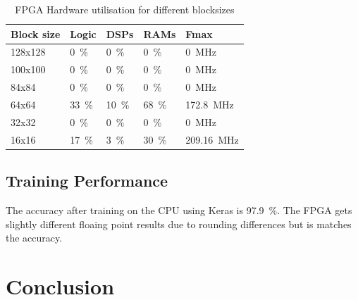 \documentclass[techrep,english]{ipsj} %
\begin{document}
\begin{table}[h]
  \centering
  \caption{FPGA Hardware utilisation for different blocksizes}\label{tab:fpga-util}
  \begin{tabular}{lllll}
    \toprule
    \textbf{Block size} & \textbf{Logic} & \textbf{DSPs} & \textbf{RAMs} & \textbf{Fmax} \\
    \midrule
    128x128 & \SI{0}{\percent} & \SI{0}{\percent} & \SI{0}{\percent} & \SI{0}{\mega\hertz}  \\
    100x100 & \SI{0}{\percent} & \SI{0}{\percent} & \SI{0}{\percent} & \SI{0}{\mega\hertz}  \\
    84x84 & \SI{0}{\percent} & \SI{0}{\percent} & \SI{0}{\percent} & \SI{0}{\mega\hertz}  \\
    64x64 & \SI{33}{\percent} & \SI{10}{\percent} & \SI{68}{\percent} & \SI{172.8}{\mega\hertz}  \\
    32x32 & \SI{0}{\percent} & \SI{0}{\percent} & \SI{0}{\percent} & \SI{0}{\mega\hertz}  \\
    16x16 & \SI{17}{\percent} & \SI{3}{\percent} & \SI{30}{\percent} & \SI{209.16}{\mega\hertz}  \\
    \bottomrule
  \end{tabular}
\end{table}

\subsection{Training Performance}
The accuracy after training on the CPU using Keras is \SI{97.9}{\percent}.
The FPGA gets slightly different floaing point results due to rounding differences but is matches the accuracy.

\section{Conclusion}\label{sec:conclusion}
\end{document}
